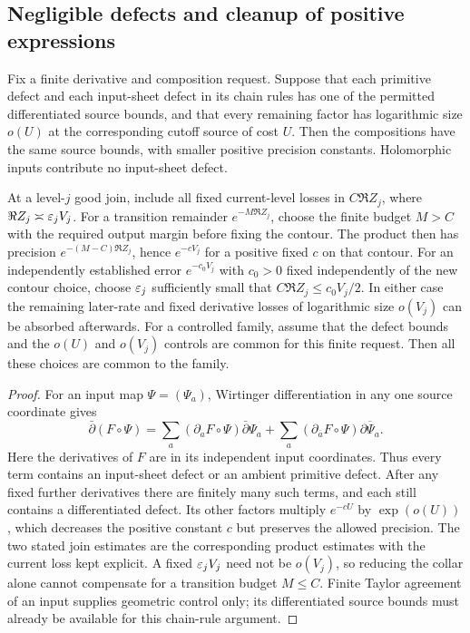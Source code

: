 \subsection{Negligible defects and cleanup of positive expressions}

\begin{lemma}
\label{lem:calculus-source-pullback}
Fix a finite derivative and composition request.  Suppose that each
primitive defect and each input-sheet defect in its chain rules has one
of the permitted differentiated source bounds, and that every remaining
factor has logarithmic size $o(U)$ at the corresponding cutoff source
of cost $U$.  Then the compositions have the same source bounds, with
smaller positive precision constants.  Holomorphic inputs contribute no
input-sheet defect.

At a level-$j$ good join, include all fixed current-level losses in
$C\Re Z_j$, where $\Re Z_j\asymp\varepsilon_jV_j$.  For a transition remainder
$e^{-M\Re Z_j}$, choose the finite budget $M>C$ with the required output
margin before fixing the contour.  The product then has precision
$e^{-(M-C)\Re Z_j}$, hence $e^{-cV_j}$ for a positive fixed $c$ on that
contour.  For an independently established error $e^{-c_0V_j}$ with
$c_0>0$ fixed independently of the new contour choice, choose $\varepsilon_j$
sufficiently small that $C\Re Z_j\le c_0V_j/2$.
In either case the remaining later-rate and fixed derivative losses of
logarithmic size $o(V_j)$ can be absorbed afterwards.  For a controlled
family, assume that the defect bounds and the $o(U)$ and $o(V_j)$ controls
are common for this finite request.  Then all these choices are common
to the family.
\end{lemma}

\begin{proof}
For an input map $\Psi=(\Psi_a)$, Wirtinger differentiation in any one
source coordinate gives
\[
 \bar\partial(F\circ\Psi)
 =\sum_a(\partial_aF\circ\Psi)\bar\partial\Psi_a
  +\sum_a(\partial_{\bar a}F\circ\Psi)
                         \overline{\partial\Psi_a}.
\]
Here the derivatives of $F$ are in its independent input coordinates.
Thus every term contains an input-sheet defect or an ambient primitive
defect.
After any fixed further derivatives there are finitely many such terms,
and each still contains a differentiated defect.  Its other factors
multiply $e^{-cU}$ by $\exp(o(U))$, which decreases the positive constant
$c$ but preserves the allowed precision.  The two stated join estimates
are the corresponding product estimates with the current loss kept
explicit.  A fixed $\varepsilon_jV_j$ need not be $o(V_j)$, so reducing the
collar alone cannot compensate for a transition budget $M\le C$.
Finite Taylor agreement of an input supplies geometric control only;
its differentiated source bounds must already be available for this
chain-rule argument.
\end{proof}

